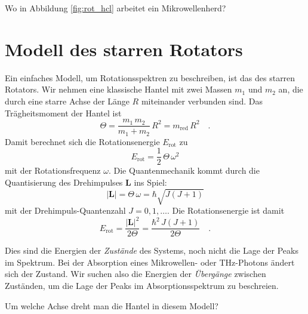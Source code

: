 \begin{marginfigure}
\caption{Das HCl-Spektrum aus Abbildung \ref{fig:rot_hcl} als Extinktionsspektrum.}
\end{marginfigure}


\begin{questions} 
\item Wo in  Abbildung  \ref{fig:rot_hcl} arbeitet ein Mikrowellenherd?
\end{questions}


\section{Modell des starren Rotators}

Ein einfaches Modell, um Rotationsspektren zu beschreiben, ist das des starren Rotators. Wir nehmen eine klassische Hantel mit zwei Massen $m_1$ und $m_2$ an, die durch eine starre Achse der Länge $R$ miteinander verbunden sind. Das Trägheitsmoment der Hantel ist
\begin{equation}
 \Theta = \frac{m_1 \, m_2}{m_1 + m_2} \, R^2 = m_\text{red} \, R^2 \quad .
\end{equation}
Damit berechnet sich die Rotationsenergie $E_\text{rot}$ zu
\begin{equation}
 E_\text{rot} = \frac{1}{2} \, \Theta \, \omega^2
\end{equation}
mit der Rotationsfrequenz $\omega$. Die Quantenmechanik kommt durch die Quantisierung des Drehimpulses $\mathbf{L} $ ins Spiel:
\begin{equation}
 | \mathbf{L} | = \Theta \, \omega = \hbar \sqrt{J (J + 1)}
\end{equation}
mit der Drehimpuls-Quantenzahl $J = 0, 1, \dots$. Die Rotationsenergie ist damit
\begin{equation}
 E_\text{rot} = \frac{ | \mathbf{L} |^2}{2 \Theta} = \frac{\hbar^2 \, J (J+1)}{2 \Theta} \quad .
\end{equation}

Dies sind die Energien der \emph{Zustände} des Systems, noch nicht die Lage der Peaks im Spektrum. Bei der Absorption eines Mikrowellen- oder THz-Photons ändert sich der Zustand. Wir suchen also die Energien der \emph{Übergänge} zwischen Zuständen, um die Lage der Peaks im Absorptionsspektrum zu beschreien.


\begin{questions} 
\item Um welche Achse dreht man die Hantel in diesem Modell?
\end{questions}


